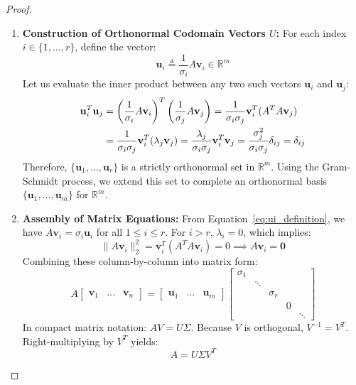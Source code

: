 \begin{proof}
\begin{enumerate}
    \item \textbf{Construction of Orthonormal Codomain Vectors $U$:}
    For each index $i \in \{1, \dots, r\}$, define the vector:
    \begin{equation}
    \mathbf{u}_i \triangleq \frac{1}{\sigma_i} A \mathbf{v}_i \in \mathbb{R}^m
    \label{eq:ui_definition}
    \end{equation}
    Let us evaluate the inner product between any two such vectors $\mathbf{u}_i$ and $\mathbf{u}_j$:
    \begin{align}
    \mathbf{u}_i^T \mathbf{u}_j &= \left( \frac{1}{\sigma_i} A \mathbf{v}_i \right)^T \left( \frac{1}{\sigma_j} A \mathbf{v}_j \right) = \frac{1}{\sigma_i \sigma_j} \mathbf{v}_i^T (A^T A \mathbf{v}_j) \notag \\
    &= \frac{1}{\sigma_i \sigma_j} \mathbf{v}_i^T (\lambda_j \mathbf{v}_j) = \frac{\lambda_j}{\sigma_i \sigma_j} \mathbf{v}_i^T \mathbf{v}_j = \frac{\sigma_j^2}{\sigma_i \sigma_j} \delta_{ij} = \delta_{ij}
    \end{align}
    Therefore, $\{\mathbf{u}_1, \dots, \mathbf{u}_r\}$ is a strictly orthonormal set in $\mathbb{R}^m$. Using the Gram-Schmidt process, we extend this set to complete an orthonormal basis $\{\mathbf{u}_1, \dots, \mathbf{u}_m\}$ for $\mathbb{R}^m$.

    \item \textbf{Assembly of Matrix Equations:}
    From Equation~\eqref{eq:ui_definition}, we have $A\mathbf{v}_i = \sigma_i \mathbf{u}_i$ for all $1 \le i \le r$.
    For $i > r$, $\lambda_i = 0$, which implies:
    \begin{equation}
    \|A\mathbf{v}_i\|_2^2 = \mathbf{v}_i^T (A^T A \mathbf{v}_i) = 0 \implies A\mathbf{v}_i = \mathbf{0}
    \end{equation}
    Combining these column-by-column into matrix form:
    \begin{equation}
    A \begin{bmatrix} \mathbf{v}_1 & \dots & \mathbf{v}_n \end{bmatrix} = \begin{bmatrix} \mathbf{u}_1 & \dots & \mathbf{u}_m \end{bmatrix} \begin{bmatrix} \sigma_1 & & & & \\ & \ddots & & & \\ & & \sigma_r & & \\ & & & 0 & \\ & & & & \ddots \end{bmatrix}
    \end{equation}
    In compact matrix notation: $A V = U \Sigma$. Because $V$ is orthogonal, $V^{-1} = V^T$. Right-multiplying by $V^T$ yields:
    \begin{equation}
    A = U \Sigma V^T
    \end{equation}
\end{enumerate}
\end{proof}

